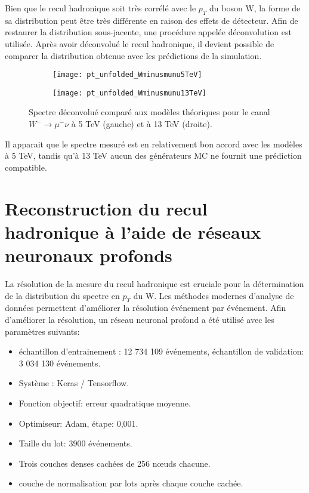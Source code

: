 Bien que le recul hadronique soit très corrélé avec le $p_T$  du boson W, la forme de sa distribution peut être très différente en raison des effets de détecteur. Afin de restaurer la distribution sous-jacente, une procédure appelée déconvolution est utilisée. Après avoir déconvolué le recul hadronique, il devient possible de comparer la distribution obtenue avec les prédictions de la simulation.
\begin{figure}[htbp]
	\begin{subfigure}[t]{0.48\textwidth}
		\texttt{[image: pt\_unfolded\_Wminusmunu5TeV]}
	\end{subfigure}
	\hfill
	\begin{subfigure}[t]{0.48\textwidth}
		\texttt{[image: pt\_unfolded\_Wminusmunu13TeV]}
	\end{subfigure}
	\caption[Comparison with MC spectra]{Spectre déconvolué comparé aux modèles théoriques pour le canal $W^{-}\rightarrow \mu^{-} \nu$ à 5 TeV (gauche) et à 13 TeV (droite).}
	\label{fig::spectrum_comparison}
\end{figure}

Il apparait que le spectre mesuré est en relativement bon accord avec les modèles à 5 TeV, tandis qu'à 13 TeV aucun des générateurs MC ne fournit une prédiction compatible.
\section*{Reconstruction du recul hadronique à l'aide de réseaux neuronaux profonds}
La résolution de la mesure du recul hadronique est cruciale pour la détermination de la distribution du spectre en $p_T$ du W. Les méthodes modernes d'analyse de données permettent d'améliorer la résolution événement par événement. Afin d'améliorer la résolution, un réseau neuronal profond a été utilisé avec les paramètres suivants:
\begin{itemize}
	\item échantillon d'entrainement : 12 734 109 événements, échantillon de validation: 3 034 130 événements.
	\item Système : Keras / Tensorflow.
	\item Fonction objectif: erreur quadratique moyenne.
	\item Optimiseur: Adam, étape: 0,001.
	\item Taille du lot: 3900 événements.
	\item Trois couches denses cachées de 256 nœuds chacune.
	\item couche de normalisation par lots après chaque couche cachée.
\end{itemize}


